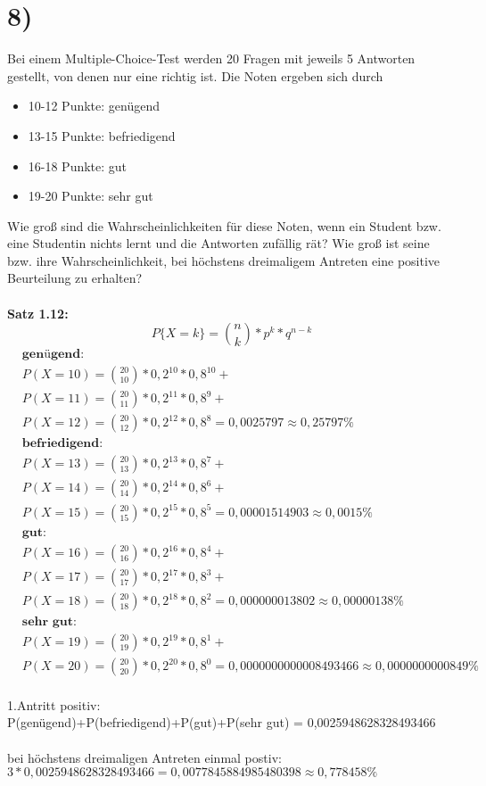 \documentclass[11pt,a4paper]{article}
\begin{document}
	\section*{8)}
	Bei einem Multiple-Choice-Test werden 20 Fragen mit jeweils 5 Antworten gestellt, von denen nur eine richtig ist. Die Noten ergeben sich durch
  	\begin{itemize}
  		\item 10-12 Punkte: genügend
  		\item 13-15 Punkte: befriedigend
  		\item 16-18 Punkte: gut
  		\item 19-20 Punkte: sehr gut
  	\end{itemize}
  	Wie groß sind die Wahrscheinlichkeiten für diese Noten, wenn ein Student bzw. eine Studentin nichts lernt und die Antworten zufällig rät? Wie groß ist seine bzw. ihre Wahrscheinlichkeit, bei höchstens dreimaligem Antreten eine positive Beurteilung zu erhalten?\\
  	\\
  	\textbf{Satz 1.12:}\\
  	\[P\{X=k\} = \binom{n}{k} * p^k * q^{n-k} \]
  	\begin{align*}
  		& \textbf{genügend:} \\
  		& P(X=10) = \binom{20}{10} * 0,2^{10} * 0,8^{10} + \\
  		& P(X=11) = \binom{20}{11} * 0,2^{11} * 0,8^{9} + \\
  		& P(X=12) = \binom{20}{12} * 0,2^{12} * 0,8^{8} = 0,0025797 \approx 0,25797\%
  		\\
  		& \textbf{befriedigend:} \\
  		& P(X=13) = \binom{20}{13} * 0,2^{13} * 0,8^{7} + \\
  		& P(X=14) = \binom{20}{14} * 0,2^{14} * 0,8^{6} + \\
  		& P(X=15) = \binom{20}{15} * 0,2^{15} * 0,8^{5} = 0,00001514903 \approx 0,0015\%
  		\\
  		& \textbf{gut:} \\
  		& P(X=16) = \binom{20}{16} * 0,2^{16} * 0,8^{4} + \\
  		& P(X=17) = \binom{20}{17} * 0,2^{17} * 0,8^{3} + \\
  		& P(X=18) = \binom{20}{18} * 0,2^{18} * 0,8^{2} = 0,000000013802 \approx 0,00000138\%
  		\\
  		& \textbf{sehr gut:} \\
  		& P(X=19) = \binom{20}{19} * 0,2^{19} * 0,8^{1} + \\
  		& P(X=20) = \binom{20}{20} * 0,2^{20} * 0,8^{0} = 0,0000000000008493466 \approx 0,0000000000849\%
  	\end{align*}
  	\\
  	1.Antritt positiv:\\
  	P(genügend)+P(befriedigend)+P(gut)+P(sehr gut) = 0,0025948628328493466\\
  	\\
  	bei höchstens dreimaligen Antreten einmal postiv:\\
  	\(3* 0,0025948628328493466 = 0,0077845884985480398 \approx 0,778458\% \)
  	
  	
  	
\end{document}
